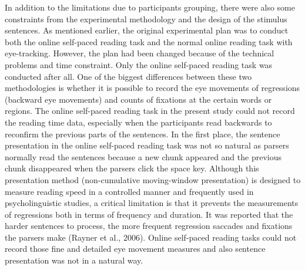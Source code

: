 \documentclass[
]{article}
\begin{document}
In addition to the limitations due to participants grouping, there were
also some constraints from the experimental methodology and the design
of the stimulus sentences. As mentioned earlier, the original
experimental plan was to conduct both the online self-paced reading task
and the normal online reading task with eye-tracking. However, the plan
had been changed because of the technical problems and time constraint.
Only the online self-paced reading task was conducted after all. One of
the biggest differences between these two methodologies is whether it is
possible to record the eye movements of regressions (backward eye
movements) and counts of fixations at the certain words or regions. The
online self-paced reading task in the present study could not record the
reading time data, especially when the participants read backwards to
reconfirm the previous parts of the sentences. In the first place, the
sentence presentation in the online self-paced reading task was not so
natural as parsers normally read the sentences because a new chunk
appeared and the previous chunk disappeared when the parsers click the
space key. Although this presentation method (non-cumulative
moving-window presentation) is designed to measure reading speed in a
controlled manner and frequently used in psycholinguistic studies, a
critical limitation is that it prevents the measurements of regressions
both in terms of frequency and duration. It was reported that the harder
sentences to process, the more frequent regression saccades and
fixations the parsers make (Rayner et al., 2006). Online self-paced
reading tasks could not record those fine and detailed eye movement
measures and also sentence presentation was not in a natural way.
\end{document}
